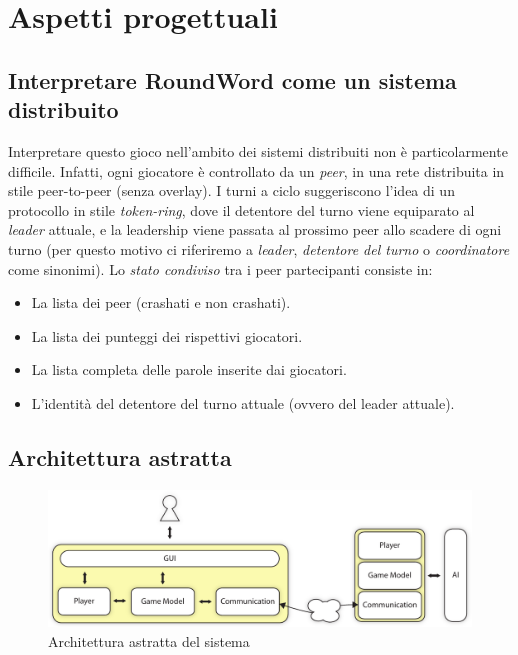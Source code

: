 \documentclass[10.5pt]{article}
\begin{document}
\section{Aspetti progettuali}

\subsection{Interpretare RoundWord come un sistema distribuito}
Interpretare questo gioco nell'ambito dei sistemi distribuiti non è particolarmente difficile. Infatti, ogni giocatore è controllato da un \emph{peer}, in una rete distribuita in stile peer-to-peer (senza overlay). I turni a ciclo suggeriscono l'idea di un protocollo in stile \emph{token-ring}, dove il detentore del turno viene equiparato al \emph{leader} attuale, e la leadership viene passata al prossimo peer allo scadere di ogni turno (per questo motivo ci riferiremo a \emph{leader}, \emph{detentore del turno} o \emph{coordinatore} come sinonimi). Lo \emph{stato condiviso} tra i peer partecipanti consiste in:
\begin{itemize}
\item La lista dei peer (crashati e non crashati).
\item La lista dei punteggi dei rispettivi giocatori.
\item La lista completa delle parole inserite dai giocatori.
\item L'identità del detentore del turno attuale (ovvero del leader attuale).
\end{itemize}


\subsection{Architettura astratta}

\begin{figure}
\centering
\includegraphics[scale=0.6]{imgs/ArchitetturaAstratta.pdf}
\caption{Architettura astratta del sistema}
\label{img:architettura-astratta}
\end{figure}
\end{document}
